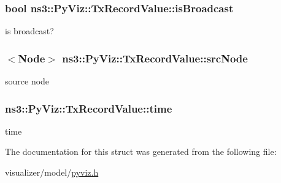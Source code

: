 \subsubsection[{\texorpdfstring{is\+Broadcast}{isBroadcast}}]{\setlength{\rightskip}{0pt plus 5cm}bool ns3\+::\+Py\+Viz\+::\+Tx\+Record\+Value\+::is\+Broadcast}\hypertarget{structns3_1_1PyViz_1_1TxRecordValue_a24c3b95b8c41c5d24f23ad119ec89158}{}\label{structns3_1_1PyViz_1_1TxRecordValue_a24c3b95b8c41c5d24f23ad119ec89158}


is broadcast? 

\subsubsection[{\texorpdfstring{src\+Node}{srcNode}}]{$<${\bf Node}$>$ ns3\+::\+Py\+Viz\+::\+Tx\+Record\+Value\+::src\+Node}\hypertarget{structns3_1_1PyViz_1_1TxRecordValue_a00e3ea0ee813004f2dfae5b7b4c33ce0}{}\label{structns3_1_1PyViz_1_1TxRecordValue_a00e3ea0ee813004f2dfae5b7b4c33ce0}


source node 

\subsubsection[{\texorpdfstring{time}{time}}]{ ns3\+::\+Py\+Viz\+::\+Tx\+Record\+Value\+::time}\hypertarget{structns3_1_1PyViz_1_1TxRecordValue_a4617fed3b591689ee1a1bc855fd0b14a}{}\label{structns3_1_1PyViz_1_1TxRecordValue_a4617fed3b591689ee1a1bc855fd0b14a}


time 



The documentation for this struct was generated from the following file\+:\begin{DoxyCompactItemize}
\item 
visualizer/model/\hyperlink{pyviz_8h}{pyviz.\+h}\end{DoxyCompactItemize}
